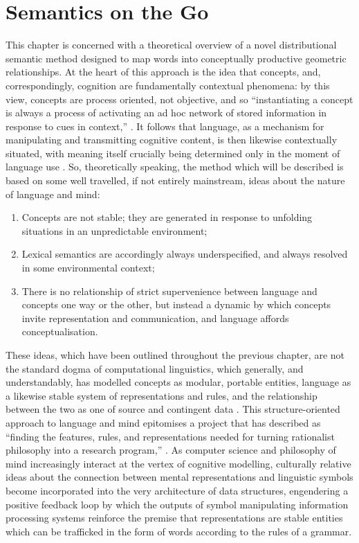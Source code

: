 \chapter{Semantics on the Go} \label{chap:theory}
This chapter is concerned with a theoretical overview of a novel distributional semantic method designed to map words into conceptually productive geometric relationships.  At the heart of this approach is the idea that concepts, and, correspondingly, cognition are fundamentally contextual phenomena: by this view, concepts are process oriented, not objective, and so ``instantiating a concept is always a process of activating an ad hoc network of stored information in response to cues in context,'' \citep[][p. 546]{Casasanto2015}.  It follows that language, as a mechanism for manipulating and transmitting cognitive content, is then likewise contextually situated, with meaning itself crucially being determined only in the moment of language use \citep{Austin1962}.  So, theoretically speaking, the method which will be described is based on some well travelled, if not entirely mainstream, ideas about the nature of language and mind:

\begin{enumerate}
\item{Concepts are not stable; they are generated in response to unfolding situations in an unpredictable environment;}
\item{Lexical semantics are accordingly always underspecified, and always resolved in some environmental context;}
\item{There is no relationship of strict supervenience between language and concepts one way or the other, but instead a dynamic by which concepts invite representation and communication, and language affords conceptualisation.}
\end{enumerate}

These ideas, which have been outlined throughout the previous chapter, are not the standard dogma of computational linguistics, which generally, and understandably, has modelled concepts as modular, portable entities, language as a likewise stable system of representations and rules, and the relationship between the two as one of source and contingent data \citep[see, for instance, the textbook treatment in][particularly Ch. 17]{JurafskyEA2000}.  This structure-oriented approach to language and mind epitomises a project that \citeauthor{Dreyfus2012} has described as ``finding the features, rules, and representations needed for turning rationalist philosophy into a research program,'' \cite[][p. 89]{Dreyfus2012}.  As computer science and philosophy of mind increasingly interact at the vertex of cognitive modelling, culturally relative ideas about the connection between mental representations and linguistic symbols become incorporated into the very architecture of data structures, engendering a positive feedback loop by which the outputs of symbol manipulating information processing systems reinforce the premise that representations are stable entities which can be trafficked in the form of words according to the rules of a grammar.

